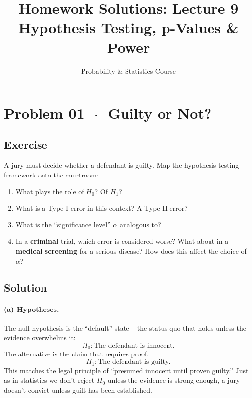 \documentclass[11pt]{article}
\title{Homework Solutions: Lecture 9\\[4pt]
\large Hypothesis Testing, p-Values \& Power}
\author{Probability \& Statistics Course}
\date{}
\begin{document}
\maketitle

\section*{Problem 01 \texorpdfstring{$\,\cdot\,$}{-} Guilty or Not?}

\subsection*{Exercise}

A jury must decide whether a defendant is guilty. Map the hypothesis-testing framework onto the courtroom:

\begin{enumerate}[label=\alph*)]
  \item What plays the role of $H_0$? Of $H_1$?
  \item What is a Type I error in this context? A Type II error?
  \item What is the ``significance level'' $\alpha$ analogous to?
  \item In a \textbf{criminal} trial, which error is considered worse? What about in a \textbf{medical screening} for a serious disease? How does this affect the choice of $\alpha$?
\end{enumerate}

\subsection*{Solution}

\paragraph{(a) Hypotheses.}

The null hypothesis is the ``default'' state -- the status quo that holds unless the evidence overwhelms it:
\[
  H_0\colon \text{The defendant is innocent.}
\]
The alternative is the claim that requires proof:
\[
  H_1\colon \text{The defendant is guilty.}
\]
This matches the legal principle of ``presumed innocent until proven guilty.'' Just as in statistics we don't reject $H_0$ unless the evidence is strong enough, a jury doesn't convict unless guilt has been established.
\end{document}
